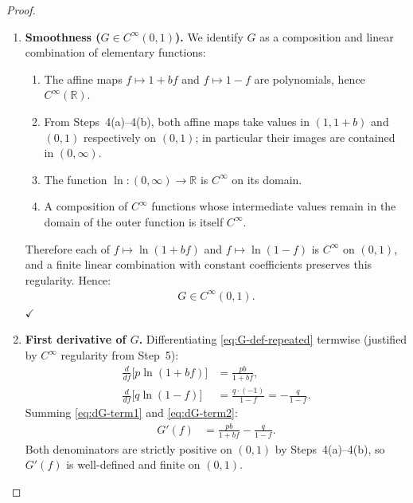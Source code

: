\documentclass[12pt,openany]{book}
\numberwithin{equation}{chapter}
\theoremstyle{plain}
\theoremstyle{definition}
\theoremstyle{remark}
\numberwithin{equation}{chapter}
\theoremstyle{plain}
\begin{document}
\begin{proof}
\begin{enumerate}[label=\textbf{Step \arabic*.}, leftmargin=*, widest=Step 9]
  \item \textbf{Smoothness ($G \in C^{\infty}(0,1)$).}
        We identify $G$ as a composition and linear combination
        of elementary functions:
        \begin{enumerate}[label=(\alph*)]
          \item The affine maps $f \mapsto 1+bf$ and
                $f \mapsto 1-f$ are polynomials, hence
                $C^{\infty}(\mathbb{R})$.
          \item From Steps~4(a)--4(b), both affine maps take
                values in $(1, 1+b)$ and $(0,1)$ respectively
                on $(0,1)$; in particular their images are
                contained in $(0,\infty)$.
          \item The function $\ln : (0,\infty)\to\mathbb{R}$
                is $C^{\infty}$ on its domain.
          \item A composition of $C^{\infty}$ functions whose
                intermediate values remain in the domain of the
                outer function is itself $C^{\infty}$.
        \end{enumerate}
        Therefore each of $f \mapsto \ln(1+bf)$ and
        $f \mapsto \ln(1-f)$ is $C^{\infty}$ on $(0,1)$, and
        a finite linear combination with constant coefficients
        preserves this regularity.  Hence:
        \begin{align}
          G \in C^{\infty}(0,1). \label{eq:G-smooth}
        \end{align}
        \hfill$\checkmark$

  \item \textbf{First derivative of $G$.}
        Differentiating \eqref{eq:G-def-repeated} termwise
        (justified by $C^{\infty}$ regularity from Step~5):
        \begin{align}
          \frac{d}{df}\bigl[p\ln(1+bf)\bigr]
            &= \frac{pb}{1+bf},
               \label{eq:dG-term1}\\[4pt]
          \frac{d}{df}\bigl[q\ln(1-f)\bigr]
            &= \frac{q\cdot(-1)}{1-f}
             = -\frac{q}{1-f}.
               \label{eq:dG-term2}
        \end{align}
        Summing \eqref{eq:dG-term1} and \eqref{eq:dG-term2}:
        \begin{align}
          G'(f) &= \frac{pb}{1+bf} - \frac{q}{1-f}.
                  \label{eq:G-prime}
        \end{align}
        Both denominators are strictly positive on $(0,1)$ by
        Steps~4(a)--4(b), so $G'(f)$ is well-defined and
        finite on $(0,1)$.


\end{enumerate}
\end{proof}
\end{document}
